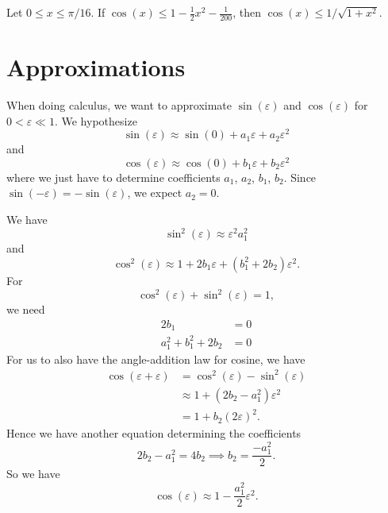 \begin{proposition}
Let $0\leq x\leq\pi/16$.
If $\cos(x)\leq 1 - \frac{1}{2}x^{2} - \frac{1}{200}$, then $\cos(x)\leq 1/\sqrt{1 + x^{2}}$.
\end{proposition}

\section{Approximations}

\M
When doing calculus, we want to approximate $\sin(\varepsilon)$ and
$\cos(\varepsilon)$ for $0<\varepsilon\ll1$. We hypothesize
\begin{equation}
\sin(\varepsilon) \approx \sin(0) + a_{1} \varepsilon + a_{2}\varepsilon^{2}
\end{equation}
and
\begin{equation}
\cos(\varepsilon) \approx \cos(0) + b_{1}\varepsilon + b_{2}\varepsilon^{2}
\end{equation}
where we just have to determine coefficients $a_{1}$, $a_{2}$, $b_{1}$,
$b_{2}$.
Since $\sin(-\varepsilon)=-\sin(\varepsilon)$, we expect $a_{2}=0$.

We have
\begin{equation}
\sin^{2}(\varepsilon)\approx \varepsilon^{2}a_{1}^{2}
\end{equation}
and
\begin{equation}
\cos^{2}(\varepsilon) \approx 1 + 2b_{1}\varepsilon + (b_{1}^{2} + 2 b_{2})\varepsilon^{2}.
\end{equation}
For
\begin{equation}
\cos^{2}(\varepsilon) + \sin^{2}(\varepsilon) = 1,
\end{equation}
we need
\begin{subequations}
\begin{align}
2b_{1} &= 0\\
a_{1}^{2} + b_{1}^{2} + 2b_{2} &= 0
\end{align}
\end{subequations}
For us to also have the angle-addition law for cosine, we have
\begin{equation}
\begin{split}
\cos(\varepsilon+\varepsilon)&=\cos^{2}(\varepsilon) - \sin^{2}(\varepsilon)\\
&\approx 1 + (2b_{2}-a_{1}^{2})\varepsilon^{2}\\
&=1 + b_{2}(2\varepsilon)^{2}.
\end{split}
\end{equation}
Hence we have another equation determining the coefficients
\begin{equation}
2b_{2} - a_{1}^{2} = 4b_{2}\implies b_{2} = \frac{-a_{1}^{2}}{2}.
\end{equation}
So we have
\begin{equation}
\cos(\varepsilon)\approx 1 - \frac{a_{1}^{2}}{2}\varepsilon^{2}.
\end{equation}

